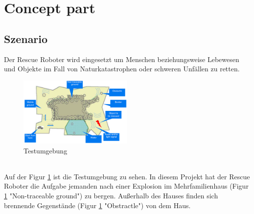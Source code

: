 \section{Concept part}

\subsection{Szenario}
Der Rescue Roboter wird eingesetzt um Menschen beziehungsweise Lebewesen und Objekte im Fall von Naturkatastrophen oder schweren Unfällen zu retten.
\begin{figure}[htbp] 
  \centering
     \includegraphics[width=0.5\textwidth]{Bilder/testumgebung.PNG}
  \caption{Testumgebung}
  \label{fig:testumgebung}
\end{figure}\\
Auf der Figur \ref{fig:testumgebung} ist die Testumgebung zu sehen. In diesem Projekt hat der Rescue Roboter die Aufgabe jemanden nach einer Explosion im Mehrfamilienhaus (Figur \ref{fig:testumgebung} "Non-traceable ground") zu bergen. Außerhalb des Hauses finden sich brennende Gegenstände (Figur \ref{fig:testumgebung} "Obstractle") von dem Haus.

